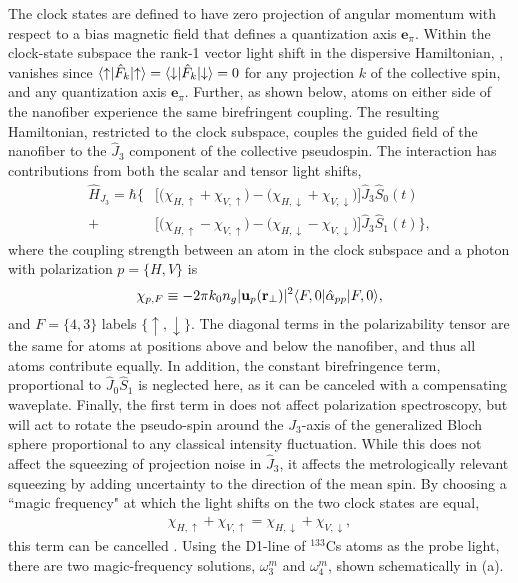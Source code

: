 \documentclass[aps,pra,twocolumn]{revtex4-1} %
\newcommand{\jz}{\hat{J}_3}
\newcommand{\magic}[1]{\omega_{#1}^m}
\begin{document}
The clock states are defined to have zero projection of angular momentum with respect to a bias magnetic field that defines a quantization axis $\mathbf{e}_\pi$.  
Within the clock-state subspace the rank-1 vector light shift in the dispersive Hamiltonian, , vanishes since $\langle{\uparrow}\rvert\hat{F}_k \lvert{\uparrow}\rangle =\langle{\downarrow}\rvert\hat{F}_k \lvert{\downarrow}\rangle = 0$ for any projection $k$ of the collective spin, and any quantization axis $\mathbf{e}_\pi$. 
Further, as shown below, atoms on either side of the nanofiber experience the same birefringent coupling. 
The resulting Hamiltonian, restricted to the clock subspace, couples the guided field of the nanofiber to the $\hat{J}_3$ component of the collective pseudospin. The interaction has contributions from both the scalar and tensor light shifts,
	\begin{align} \label{Eq::ClockHamiltonian}
		\hat{H}_{J_3} = \hbar \Big\{ & \big[ \big( \chi_{H,\uparrow} +\chi_{V,\uparrow} \big) - \big( \chi_{H,\downarrow} + \chi_{V,\downarrow}\big) \big] \jz \hat{S}_0(t) \\
		+ & \big[  \big( \chi_{H, \uparrow} - \chi_{V,\uparrow} \big) - \big(\chi_{H,\downarrow} - \chi_{V,\downarrow} \big) \big]  \jz \hat{S}_1(t) \Big\}, \nonumber
	\end{align}
where the coupling strength between an atom in the clock subspace and a photon with polarization $p = \{H,V\}$ is
	\begin{equation} \label{Eq::ClockCouplingStrength}
		\chi_{p,F} \equiv - 2\pi k_0 n_g  | \mathbf{u}_p(\mathbf{r}_\perp)|^2 \langle{F,0}\rvert\hat{\alpha}_{pp}  \lvert{F,0}\rangle,
	\end{equation}
and $F = \{4,3\}$ labels $\{\uparrow,\downarrow\}$.  
The diagonal terms in the polarizability tensor are the same for atoms at positions above and below the nanofiber, and thus all atoms contribute equally. 
In addition, the constant birefringence term, proportional to $ \hat{J}_0\hat{S}_1 $ is neglected here, as it can be canceled with a compensating waveplate. 
Finally, the first term in  does not affect polarization spectroscopy, but will act to rotate the pseudo-spin around the $J_3$-axis of the generalized Bloch sphere proportional to any classical intensity fluctuation.
While this does not affect the squeezing of projection noise in $\hat{J}_3$, it affects the metrologically relevant squeezing by adding uncertainty to the direction of the mean spin.  By choosing a ``magic frequency" at which the light shifts on the two clock states are equal, 
	\begin{align} \label{Eq::MagicWavelengthCondition}
		\chi_{H,\uparrow} +\chi_{V,\uparrow}  = \chi_{H,\downarrow} + \chi_{V,\downarrow},
	\end{align}
this term can be cancelled \cite{chaudhury_continuous_2006}.
Using the D1-line of $^{133}$Cs atoms as the probe light, there are two magic-frequency solutions, $ \magic{3} $ and $\magic{4}$, shown schematically in (a).  
\end{document}
